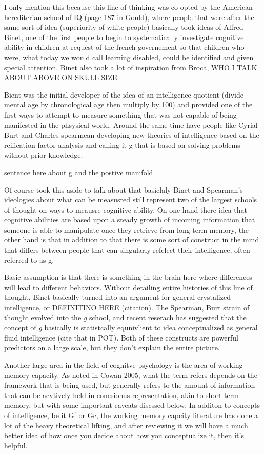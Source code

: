 \documentclass[]{book}
\theoremstyle{definition}
\theoremstyle{definition}
\theoremstyle{definition}
\theoremstyle{remark}
\begin{document}
I only mention this because this line of thinking was co-opted by the
American herediterian school of IQ (page 187 in Gould), where people
that were after the same sort of idea (superiority of white people)
basically took ideas of Alfred Binet, one of the first people to begin
to systematically investigate cognitive ability in children at request
of the french governement so that children who were, what today we would
call learning disabled, could be identified and given special attention.
Binet also took a lot of inspiration from Broca, WHO I TALK ABOUT ABOVE
ON SKULL SIZE.

Bient was the initial developer of the idea of an intelligence quotient
(divide mental age by chronological age then multiply by 100) and
provided one of the first ways to attempt to measure something that was
not capable of being manifested in the phsysical world. Around the same
time have people like Cyrial Burt and Charles spearmean developing new
theories of intelligence based on the reification factor analysis and
calling it g that is based on solving problems without prior knowledge.

sentence here about g and the postive manifold

Of course took this aside to talk about that basiclaly Binet and
Spearman's ideologies about what can be measusred still represent two of
the largest schools of thought on ways to meausre cognitive ability. On
one hand there idea that cognitive abilities are based upon a steady
growth of incoming information that someone is able to manipulate once
they retrieve from long term memory, the other hand is that in addition
to that there is some sort of construct in the mind that differs between
people that can singularly refelect their intelligence, often referred
to as g.

Basic assumption is that there is something in the brain here where
differences will lead to different behaviors. Without detailing entire
histories of this line of thought, Binet basically turned into an
argument for general crystalized intelligence, or DEFINITINO HERE
(citation). The Spearman, Burt strain of thought evolved into the
\emph{g} school, and recent reserach has suggested that the concept of
\emph{g} basically is statistcally equnivlient to idea conceptualized as
general fluid intelligence (cite that in POT). Both of these constructs
are powerful predictors on a large scale, but they don't explain the
entire picture.

Another large area in the field of cognitve psychology is the area of
working memory capacity. As noted in Cowan 2005, what the term refers
depends on the framework that is being used, but generally refers to the
amount of information that can be acvtively held in concsionus
representation, akin to short term memory, but with some important
caveats discssed below. In additon to concepts of intelligence, be it Gf
or Gc, the working memory capcity literature has done a lot of the heavy
theoretical lifting, and after reviewing it we will have a much better
idea of how once you decide about how you conceptualize it, then it's
helpful.
\end{document}
